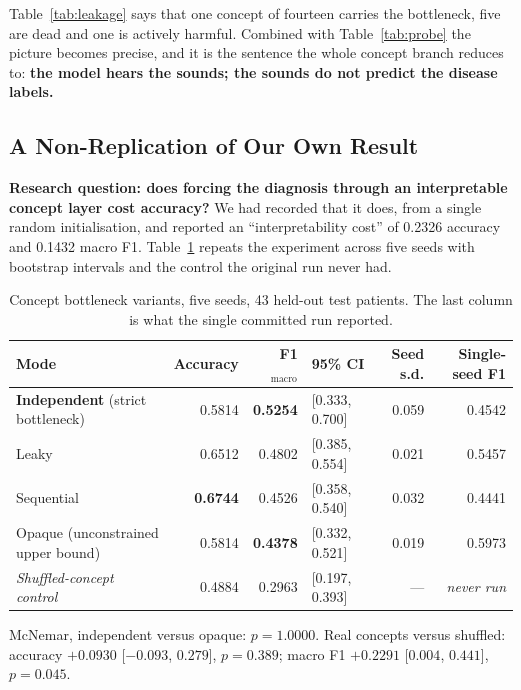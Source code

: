 \documentclass[journal,onecolumn]{IEEEtran}
\newcommand{\best}[1]{\textbf{#1}}
\begin{document}
Table~\ref{tab:leakage} says that one concept of fourteen carries the bottleneck,
five are dead and one is actively harmful. Combined with
Table~\ref{tab:probe} the picture becomes precise, and it is the sentence the
whole concept branch reduces to: \textbf{the model hears the sounds; the sounds do
not predict the disease labels.}

\subsection{A Non-Replication of Our Own Result}
\label{subsec:bottleneck}

\textbf{Research question: does forcing the diagnosis through an interpretable
concept layer cost accuracy?} We had recorded that it does, from a single random
initialisation, and reported an ``interpretability cost'' of 0.2326 accuracy and
0.1432 macro F1. Table~\ref{tab:bottleneck} repeats the experiment across five
seeds with bootstrap intervals and the control the original run never had.

\begin{table}[!t]
\centering
\caption{Concept bottleneck variants, five seeds, 43 held-out test patients. The
last column is what the single committed run reported.}
\label{tab:bottleneck}
\small
\begin{tabular}{lrrlrr}
\toprule
Mode & Accuracy & F1$_{\text{macro}}$ & 95\% CI & Seed s.d. & Single-seed F1 \\
\midrule
\best{Independent} (strict bottleneck) & 0.5814 & \best{0.5254} & [0.333, 0.700] & 0.059 & 0.4542 \\
Leaky                                  & 0.6512 & 0.4802 & [0.385, 0.554] & 0.021 & 0.5457 \\
Sequential                             & \best{0.6744} & 0.4526 & [0.358, 0.540] & 0.032 & 0.4441 \\
Opaque (unconstrained upper bound)     & 0.5814 & \best{0.4378} & [0.332, 0.521] & 0.019 & 0.5973 \\
\emph{Shuffled-concept control}        & 0.4884 & 0.2963 & [0.197, 0.393] & --- & \emph{never run} \\
\bottomrule
\end{tabular}

\vspace{2pt}
\footnotesize McNemar, independent versus opaque: $p = 1.0000$. Real concepts
versus shuffled: accuracy $+0.0930$ [$-0.093$, $0.279$], $p=0.389$; macro F1
$+0.2291$ [$0.004$, $0.441$], $p=0.045$.
\end{table}
\end{document}
